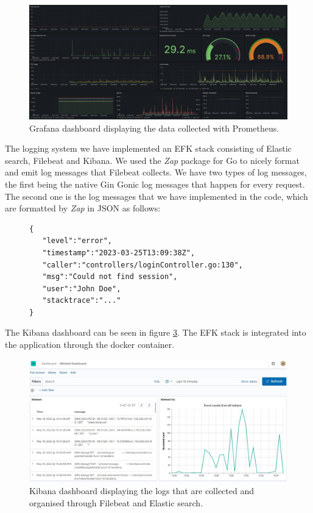 \begin{figure}[H]
    \centering
    \includegraphics[width=\textwidth]{images/grafana.png}
    \caption{Grafana dashboard displaying the data collected with Prometheus.}
    \label{fig:grafana_dashboard}
\end{figure}

The logging system we have implemented an EFK stack consisting of Elastic search, Filebeat and Kibana. We used the \textit{Zap} package for Go to nicely format and emit log messages that Filebeat collects. We have two types of log messages, the first being the native Gin Gonic log messages that happen for every request. The second one is the log messages that we have implemented in the code, which are formatted by \textit{Zap} in JSON as follows:

\begin{figure}[H]
    \begin{footnotesize}
        \begin{verbatim}
{
   "level":"error",
   "timestamp":"2023-03-25T13:09:38Z",
   "caller":"controllers/loginController.go:130",
   "msg":"Could not find session",
   "user":"John Doe",
   "stacktrace":"..."
}
        \end{verbatim}
    \end{footnotesize}
    \label{fig:my_label}
\end{figure}

The Kibana dashboard can be seen in figure \ref{fig:kibana_dashboard}. The EFK stack is integrated into the application through the docker container.

\begin{figure}[H]
    \centering
    \includegraphics[width=\textwidth]{images/kibana.jpg}
    \caption{Kibana dashboard displaying the logs that are collected and organised through Filebeat and Elastic search.}
    \label{fig:kibana_dashboard}
\end{figure}


